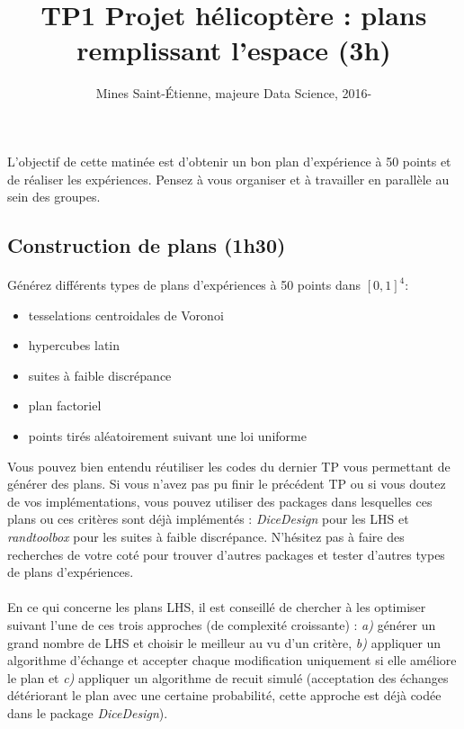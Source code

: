 \documentclass[a4paper,10pt]{article}
\title{\vspace{-1cm} TP1 Projet hélicoptère : plans remplissant l'espace (3h)}
\author{Mines Saint-\'Etienne, majeure Data Science,  2016\:-\:2017 }
\date{}
\begin{document}
\maketitle
L'objectif de cette matinée est d'obtenir un bon plan d'expérience à 50 points et de réaliser les expériences. Pensez à vous organiser et à travailler en parallèle au sein des groupes.

\subsection*{Construction de plans (1h30)}
\paragraph{}
Générez différents types de plans d'expériences à 50 points dans $[0,1]^4$:
\begin{itemize}
	\item tesselations centroidales de Voronoi
	\item hypercubes latin
	\item suites à faible discrépance
	\item plan factoriel
	\item points tirés aléatoirement suivant une loi uniforme
\end{itemize}
Vous pouvez bien entendu réutiliser les codes du dernier TP vous permettant de générer des plans. Si vous n'avez pas pu finir le précédent TP ou si vous doutez de vos implémentations, vous pouvez utiliser des packages dans lesquelles ces plans ou ces critères sont déjà implémentés : \emph{DiceDesign} pour les LHS et \emph{randtoolbox} pour les suites à faible discrépance. N'hésitez pas à faire des recherches de votre coté pour trouver d'autres packages et tester d'autres types de plans d'expériences.

\paragraph{}
En ce qui concerne les plans LHS, il est conseillé de chercher à les optimiser suivant l'une de ces trois approches (de complexité croissante) : \emph{a)} générer un grand nombre de LHS et choisir le meilleur au vu d'un critère, \emph{b)} appliquer un algorithme d'échange et accepter chaque modification uniquement si elle améliore le plan et \emph{c)} appliquer un algorithme de recuit simulé (acceptation des échanges détériorant le plan avec une certaine probabilité, cette approche est déjà codée dans le package \emph{DiceDesign}). 
\end{document}
